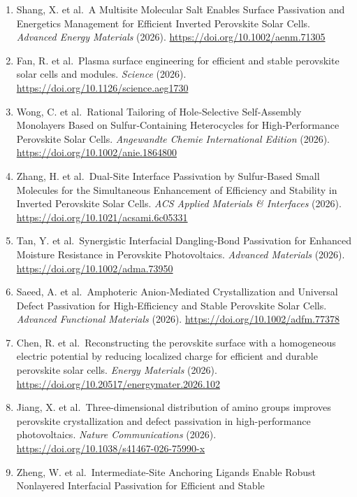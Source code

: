 \documentclass[
  11pt,
]{article}
\begin{document}
\begin{enumerate}
  high-performance inverted perovskite solar cells and modules.
  \emph{Nature Communications} (2026).
  \url{https://doi.org/10.1038/s41467-026-74018-8}
\item
  Shang, X. et al.~A Multisite Molecular Salt Enables Surface
  Passivation and Energetics Management for Efficient Inverted
  Perovskite Solar Cells. \emph{Advanced Energy Materials} (2026).
  \url{https://doi.org/10.1002/aenm.71305}
\item
  Fan, R. et al.~Plasma surface engineering for efficient and stable
  perovskite solar cells and modules. \emph{Science} (2026).
  \url{https://doi.org/10.1126/science.aeg1730}
\item
  Wong, C. et al.~Rational Tailoring of Hole‐Selective Self‐Assembly
  Monolayers Based on Sulfur‐Containing Heterocycles for
  High‐Performance Perovskite Solar Cells. \emph{Angewandte Chemie
  International Edition} (2026).
  \url{https://doi.org/10.1002/anie.1864800}
\item
  Zhang, H. et al.~Dual-Site Interface Passivation by Sulfur-Based Small
  Molecules for the Simultaneous Enhancement of Efficiency and Stability
  in Inverted Perovskite Solar Cells. \emph{ACS Applied Materials \&
  Interfaces} (2026). \url{https://doi.org/10.1021/acsami.6c05331}
\item
  Tan, Y. et al.~Synergistic Interfacial Dangling‐Bond Passivation for
  Enhanced Moisture Resistance in Perovskite Photovoltaics.
  \emph{Advanced Materials} (2026).
  \url{https://doi.org/10.1002/adma.73950}
\item
  Saeed, A. et al.~Amphoteric Anion‐Mediated Crystallization and
  Universal Defect Passivation for High‐Efficiency and Stable Perovskite
  Solar Cells. \emph{Advanced Functional Materials} (2026).
  \url{https://doi.org/10.1002/adfm.77378}
\item
  Chen, R. et al.~Reconstructing the perovskite surface with a
  homogeneous electric potential by reducing localized charge for
  efficient and durable perovskite solar cells. \emph{Energy Materials}
  (2026). \url{https://doi.org/10.20517/energymater.2026.102}
\item
  Jiang, X. et al.~Three-dimensional distribution of amino groups
  improves perovskite crystallization and defect passivation in
  high-performance photovoltaics. \emph{Nature Communications} (2026).
  \url{https://doi.org/10.1038/s41467-026-75990-x}
\item
  Zheng, W. et al.~Intermediate‐Site Anchoring Ligands Enable Robust
  Nonlayered Interfacial Passivation for Efficient and Stable

\end{enumerate}
\end{document}
